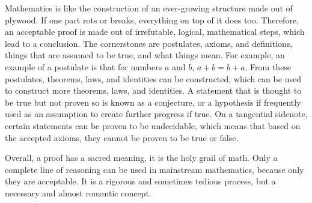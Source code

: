 \documentclass{article}
\begin{document}
Mathematics is like the construction of an ever-growing structure made out of plywood. If one part rots or breaks, everything on top of it does too. Therefore, an acceptable proof is made out of irrefutable, logical, mathematical steps, which lead to a conclusion. The cornerstones are postulates, axioms, and definitions, things that are assumed to be true, and what things mean. For example, an example of a postulate is that for numbers $a$ and $b$, $a + b = b + a$. From these postulates, theorems, laws, and identities can be constructed, which can be used to construct more theorems, laws, and identities. A statement that is thought to be true but not proven so is known as a conjecture, or a hypothesis if frequently used as an assumption to create further progress if true. On a tangential sidenote, certain statements can be proven to be undecidable, which means that based on the accepted axioms, they cannot be proven to be true or false. 

Overall, a proof has a sacred meaning, it is the holy grail of math. Only a complete line of reasoning can be used in mainstream mathematics, because only they are acceptable. It is a rigorous and sometimes tedious process, but a necessary and almost romantic concept.
\end{document}
